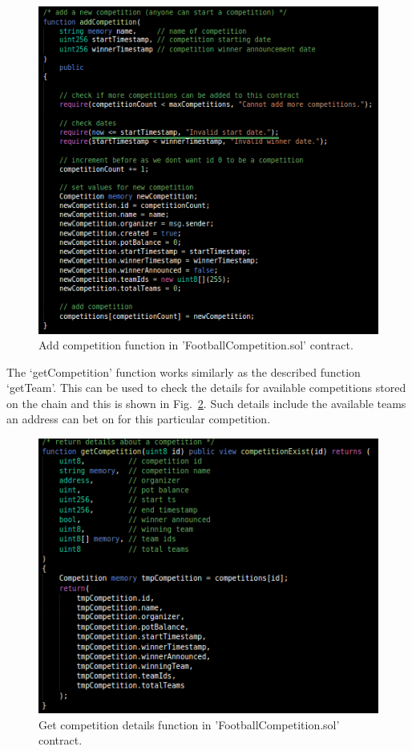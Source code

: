 \begin{figure}[H]
\centering
  \includegraphics[scale = .75]{imgs/comp_sol_6.png}
  \caption{Add competition function in 'FootballCompetition.sol' contract.}
  \label{fig:comp_sol_6}
\end{figure}

\noindent
The ‘getCompetition’ function works similarly as the described function  ‘getTeam’. This can be used to check the details for available competitions stored on the chain and this is shown in Fig.~\ref{fig:comp_sol_7}. Such details include the available teams an address can bet on for this particular competition. 

\begin{figure}[H]
\centering
  \includegraphics[scale = .75]{imgs/comp_sol_7.png}
  \caption{Get competition details function in 'FootballCompetition.sol' contract.}
  \label{fig:comp_sol_7}
\end{figure}

